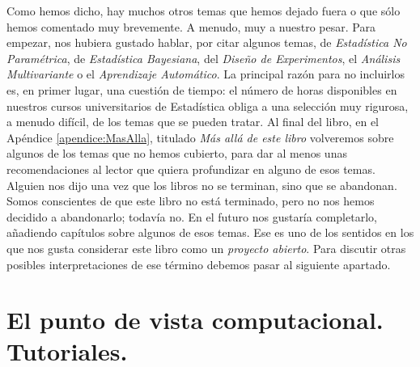 Como hemos dicho, hay muchos otros temas que hemos dejado fuera o que sólo hemos comentado muy brevemente. A menudo, muy a nuestro pesar. Para empezar, nos hubiera gustado hablar, por citar algunos temas, de {\em Estadística No Paramétrica}, de {\em Estadística Bayesiana}, del {\em Diseño de Experimentos}, el {\em Análisis Multivariante} o el {\em Aprendizaje Automático}. La principal razón para no incluirlos es, en primer lugar, una cuestión de tiempo: el número de horas disponibles en nuestros cursos universitarios de Estadística obliga a una selección muy rigurosa, a menudo difícil, de los temas que se pueden tratar. Al final del libro, en el Apéndice \ref{apendice:MasAlla}, titulado {\em Más allá de este libro} volveremos sobre algunos de los temas que no hemos cubierto, para dar al menos unas recomendaciones al lector que quiera profundizar en alguno de esos temas. Alguien nos dijo una vez que los libros no se terminan, sino que se abandonan. Somos conscientes de que este libro no está terminado, pero no nos hemos decidido a abandonarlo; todavía no. En el futuro nos gustaría completarlo, añadiendo capítulos sobre algunos de esos temas. Ese es uno de los sentidos en los que nos gusta considerar este libro como un {\em proyecto abierto}. Para discutir otras posibles interpretaciones de ese término debemos pasar al siguiente apartado.

\section*{El punto de vista computacional. Tutoriales.}
\label{prefacio:subsec:Tutoriales}

